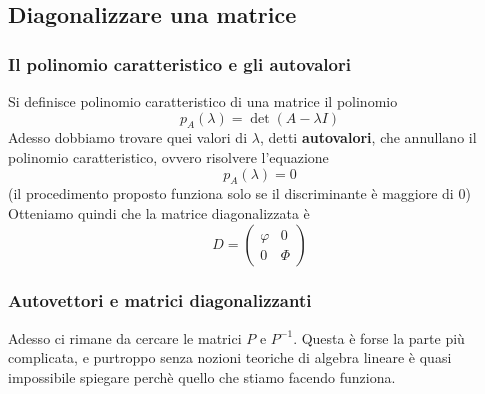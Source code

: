 \documentclass{article}     %
\begin{document}
\subsection{Diagonalizzare una matrice}
\subsubsection{Il polinomio caratteristico e gli autovalori}
Si definisce polinomio caratteristico di una matrice il polinomio
\[p_A(\lambda) = \det\left( A -\lambda I \right)\]
\grid[1.4cm]{}
Adesso dobbiamo trovare quei valori di $\lambda$, detti \textbf{autovalori}, che annullano il polinomio caratteristico, ovvero risolvere l'equazione 
\[p_A(\lambda) = 0\]
\grid[1.4cm]{}
\noindent(il procedimento proposto funziona solo se il discriminante è maggiore di 0)\\
Otteniamo quindi che la matrice diagonalizzata è
\[D =\begin{pmatrix} \varphi &0\\0&\Phi \end{pmatrix} \]
\subsubsection{Autovettori e matrici diagonalizzanti}
Adesso ci rimane da cercare le matrici $P$ e $P^{-1}$. Questa è forse la parte più complicata, e purtroppo senza nozioni teoriche di algebra lineare è quasi impossibile spiegare perchè quello che stiamo facendo funziona.
\end{document}
